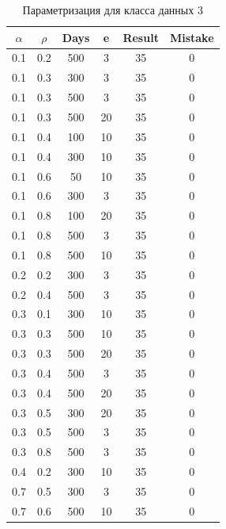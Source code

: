 \begin{center}
	\captionsetup{justification=raggedright,singlelinecheck=off}
	\begin{longtable}[c]{|c|c|c|c|c|c|}
		\caption{Параметризация для класса данных 3\label{tbl:table_kd3}} 
		\\ \hline
		$\alpha$ & $\rho$ & Days & e & Result & Mistake \\ \hline
		0.1 &  0.2 &  500 &    3 &    35 &     0 \\ \hline
		0.1 &  0.3 &  300 &    3 &    35 &     0 \\	\hline
		0.1 &  0.3 &  500 &    3 &    35 &     0 \\	\hline
		0.1 &  0.3 &  500 &   20 &    35 &     0 \\	\hline
		0.1 &  0.4 &  100 &   10 &    35 &     0 \\	\hline
		0.1 &  0.4 &  300 &   10 &    35 &     0 \\	\hline
		0.1 &  0.6 &   50 &   10 &    35 &     0 \\	\hline
		0.1 &  0.6 &  300 &    3 &    35 &     0 \\	\hline
		0.1 &  0.8 &  100 &   20 &    35 &     0 \\	\hline
		0.1 &  0.8 &  500 &    3 &    35 &     0 \\	\hline
		0.1 &  0.8 &  500 &   10 &    35 &     0 \\	\hline
		0.2 &  0.2 &  300 &    3 &    35 &     0 \\	\hline
		0.2 &  0.4 &  500 &    3 &    35 &     0 \\	\hline
		0.3 &  0.1 &  300 &   10 &    35 &     0 \\	\hline
		0.3 &  0.3 &  500 &   10 &    35 &     0 \\	\hline
		0.3 &  0.3 &  500 &   20 &    35 &     0 \\	\hline
		0.3 &  0.4 &  500 &    3 &    35 &     0 \\	\hline
		0.3 &  0.4 &  500 &   20 &    35 &     0 \\	\hline
		0.3 &  0.5 &  300 &   20 &    35 &     0 \\	\hline
		0.3 &  0.5 &  500 &    3 &    35 &     0 \\	\hline
		0.3 &  0.8 &  500 &    3 &    35 &     0 \\	\hline
		0.4 &  0.2 &  300 &   10 &    35 &     0 \\	\hline
		0.7 &  0.5 &  300 &    3 &    35 &     0 \\	\hline
		0.7 &  0.6 &  500 &   10 &    35 &     0 \\	\hline
	\end{longtable}
\end{center}

